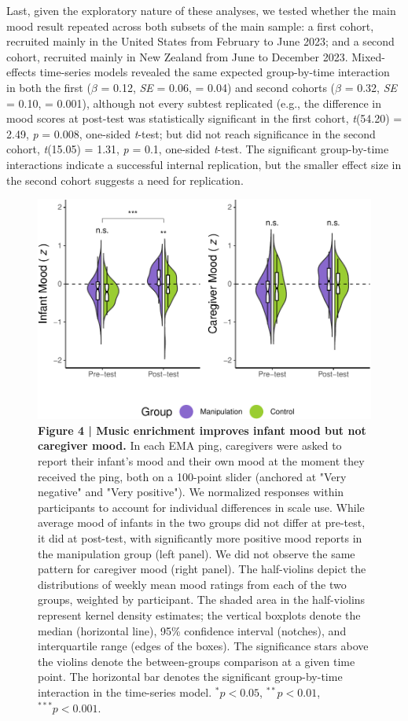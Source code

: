 \documentclass[
]{article}
\begin{document}
Last, given the exploratory nature of these analyses, we tested whether
the main mood result repeated across both subsets of the main sample: a
first cohort, recruited mainly in the United States from February to
June 2023; and a second cohort, recruited mainly in New Zealand from
June to December 2023. Mixed-effects time-series models revealed the
same expected group-by-time interaction in both the first (\(\beta\) =
0.12, \emph{SE} = 0.06, = 0.04) and second cohorts (\(\beta\) = 0.32,
\emph{SE} = 0.10, = 0.001), although not every subtest replicated (e.g.,
the difference in mood scores at post-test was statistically significant
in the first cohort, \emph{t}(54.20) = 2.49, \emph{p} = 0.008, one-sided
\emph{t}-test; but did not reach significance in the second cohort,
\emph{t}(15.05) = 1.31, \emph{p} = 0.1, one-sided \emph{t}-test. The
significant group-by-time interactions indicate a successful internal
replication, but the smaller effect size in the second cohort suggests a
need for replication.

\begin{figure}[H]
\includegraphics{MIPH_childdev_files/figure-latex/fig4-1} \caption{\textbf{Figure 4 | Music enrichment improves infant mood but not caregiver mood.} In each EMA ping, caregivers were asked to report their infant's mood and their own mood at the moment they received the ping, both on a 100-point slider (anchored at "Very negative" and "Very positive"). We normalized responses within participants to account for individual differences in scale use. While average mood of infants in the two groups did not differ at pre-test, it did at post-test, with significantly more positive mood reports in the manipulation group (left panel). We did not observe the same pattern for caregiver mood (right panel). The half-violins depict the distributions of weekly mean mood ratings from each of the two groups, weighted by participant. The shaded area in the half-violins represent kernel density estimates; the vertical boxplots denote the median (horizontal line), 95\% confidence interval (notches), and interquartile range (edges of the boxes). The significance stars above the violins denote the between-groups comparison at a given time point. The horizontal bar denotes the significant group-by-time interaction in the time-series model. $^{\ast}p < 0.05$, $^{\ast\ast}p < 0.01$, $^{\ast\ast\ast}p < 0.001$.}\label{fig:fig4}
\end{figure}
\end{document}
